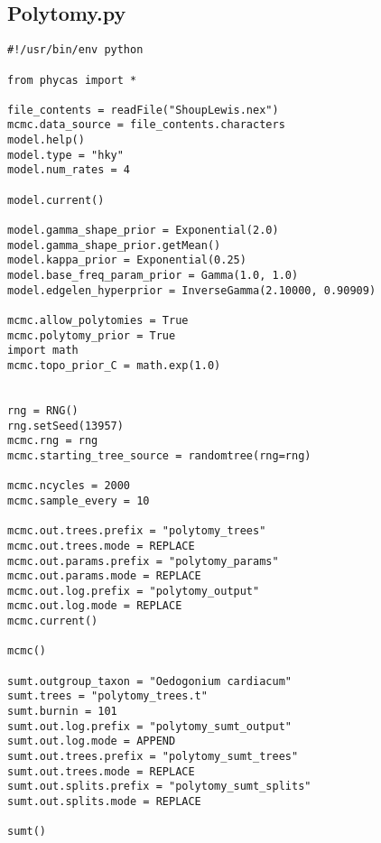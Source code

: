 \documentclass{article}
\begin{document}
\newpage
\subsection{Polytomy.py}\label{Polytomy}
\begin{verbatim}
#!/usr/bin/env python

from phycas import *

file_contents = readFile("ShoupLewis.nex")
mcmc.data_source = file_contents.characters
model.help()
model.type = "hky"
model.num_rates = 4

model.current()

model.gamma_shape_prior = Exponential(2.0)
model.gamma_shape_prior.getMean()
model.kappa_prior = Exponential(0.25)
model.base_freq_param_prior = Gamma(1.0, 1.0)
model.edgelen_hyperprior = InverseGamma(2.10000, 0.90909)

mcmc.allow_polytomies = True
mcmc.polytomy_prior = True
import math
mcmc.topo_prior_C = math.exp(1.0)


rng = RNG()
rng.setSeed(13957)
mcmc.rng = rng
mcmc.starting_tree_source = randomtree(rng=rng)

mcmc.ncycles = 2000
mcmc.sample_every = 10

mcmc.out.trees.prefix = "polytomy_trees"
mcmc.out.trees.mode = REPLACE 
mcmc.out.params.prefix = "polytomy_params"
mcmc.out.params.mode = REPLACE 
mcmc.out.log.prefix = "polytomy_output"
mcmc.out.log.mode = REPLACE 
mcmc.current()

mcmc()

sumt.outgroup_taxon = "Oedogonium cardiacum"
sumt.trees = "polytomy_trees.t" 
sumt.burnin = 101 
sumt.out.log.prefix = "polytomy_sumt_output"
sumt.out.log.mode = APPEND 
sumt.out.trees.prefix = "polytomy_sumt_trees"
sumt.out.trees.mode = REPLACE 
sumt.out.splits.prefix = "polytomy_sumt_splits"
sumt.out.splits.mode = REPLACE 

sumt()
\end{verbatim}


\newpage
\end{document}
